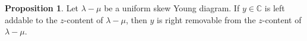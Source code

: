 \documentclass[11pt]{amsart}
\numberwithin{equation}{section}
\theoremstyle{definition}
\newtheorem{corollary}[thm]{Corollary}
\newtheorem{proposition}[thm]{Proposition}
\begin{document}




\begin{proposition} \label{prop addable removable}
Let $\lambda-\mu$ be a uniform skew Young diagram. If $y \in \mathbb C$ is left addable to the $z$-content of $\lambda -\mu$, then $y$ is right removable from  the $z$-content of $\lambda -\mu$. 
\end{proposition}
\end{document}
